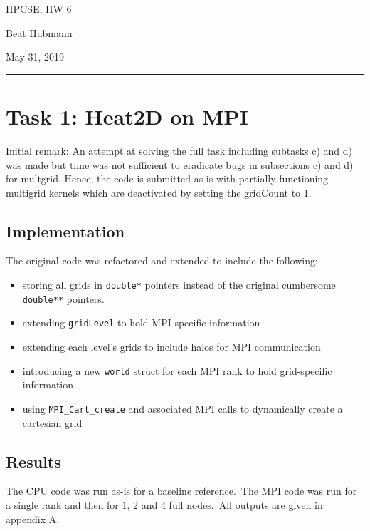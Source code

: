 \documentclass[11pt,a4paper]{article}
\begin{document}
\noindent\parbox{\linewidth}{
 \parbox{.25\linewidth}{\large HPCSE, HW 6}\hfill
 \parbox{.5\linewidth}{\begin{center} \large Beat Hubmann \end{center}}\hfill
 \parbox{.2\linewidth}{\begin{flushright} \large May 31, 2019 \end{flushright}}
}
\noindent\rule{\linewidth}{2pt}

\section{Task 1: Heat2D on MPI}

Initial remark: An attempt at solving the full task including subtasks c) and d) was made but
time was not sufficient to eradicate bugs in subsections c) and d) for multgrid. Hence,
the code is submitted as-is with partially functioning multigrid kernels which are
deactivated by setting the gridCount to 1.
\\

\subsection{Implementation}
The original code was refactored and extended to include the following:
\begin{itemize}
	\item storing all grids in \texttt{double*} pointers instead of the original cumbersome \texttt{double**} pointers.
	\item extending \texttt{gridLevel} to hold MPI-specific information
	\item extending each level's grids to include halos for MPI communication
	\item introducing a new \texttt{world} struct for each MPI rank to hold grid-specific information
	\item using \texttt{MPI\_Cart\_create} and associated MPI calls to dynamically create a cartesian grid
\end{itemize}

\subsection{Results}
The CPU code was run as-is for a baseline reference.\
The MPI code was run for a single rank and then for 1, 2 and 4 full nodes.\
All outputs are given in appendix A.
\end{document}
